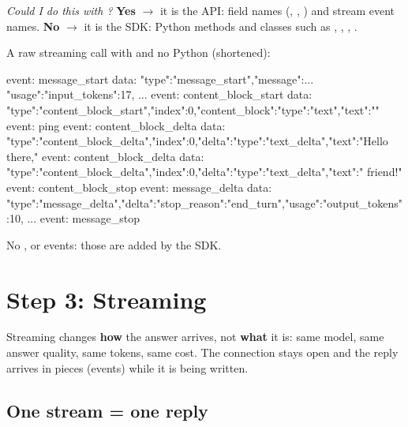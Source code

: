 \begin{gamerule}
\emph{Could I do this with ?} \textbf{Yes} $\to$ it is the API: field names
(, , ) and stream event names.
\textbf{No} $\to$ it is the SDK: Python methods and classes such as ,
, , .
\end{gamerule}

\begin{lab}
A raw streaming call with  and no Python (shortened):
\begin{rawcode}
event: message_start
data: {"type":"message_start","message":{... "usage":{"input_tokens":17, ...}}}
event: content_block_start
data: {"type":"content_block_start","index":0,"content_block":{"type":"text","text":""}}
event: ping
event: content_block_delta
data: {"type":"content_block_delta","index":0,"delta":{"type":"text_delta","text":"Hello there,"}}
event: content_block_delta
data: {"type":"content_block_delta","index":0,"delta":{"type":"text_delta","text":" friend!"}}
event: content_block_stop
event: message_delta
data: {"type":"message_delta","delta":{"stop_reason":"end_turn"},"usage":{"output_tokens":10, ...}}
event: message_stop
\end{rawcode}
No ,  or  events: those are added by the SDK.
\end{lab}

\section{Step 3: Streaming}

\begin{keyidea}
Streaming changes \textbf{how} the answer arrives, not \textbf{what} it is: same model, same
answer quality, same tokens, same cost. The connection stays open and the reply arrives in pieces
(events) while it is being written.
\end{keyidea}

\subsection{One stream = one reply}

